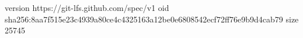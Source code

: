 version https://git-lfs.github.com/spec/v1
oid sha256:8aa7f515e23c4939a80ce4c4325163a12be0e6808542ecf72ff76e9b9d4cab79
size 25745
